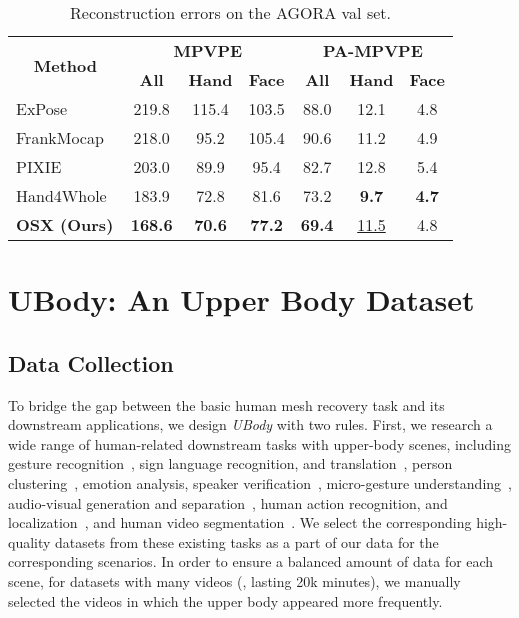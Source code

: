 \documentclass[10pt,twocolumn,letterpaper]{article}
\newcommand{\dataname}{\emph{UBody}\xspace}
\begin{document}
\begin{table}[h]
\centering
  \resizebox{\linewidth}{!}
{
    \begin{tabular}{l|ccc|ccc}
    \toprule
    \multicolumn{1}{c|}{\multirow{2}[4]{*}{\textbf{Method}}} & \multicolumn{3}{c|}{\boldmath{}\textbf{MPVPE }\unboldmath{}} & \multicolumn{3}{c}{\boldmath{}\textbf{PA-MPVPE }\unboldmath{}}\\
    \cmidrule{2-7}
    & \textbf{All} & \textbf{Hand} & \textbf{Face} & \textbf{All} & \textbf{Hand} & \textbf{Face} \\
    \midrule
ExPose~\cite{PavlakosGeorgios2020expose} &219.8 & 115.4 & 103.5 & 88.0 & 12.1 & 4.8 \\
    FrankMocap~\cite{Rong_2021frank} & 218.0 & 95.2 & 105.4 & 90.6 &11.2 &4.9  \\
    PIXIE~\cite{Feng_2021_pixie} &203.0 & 89.9 & 95.4 & 82.7 & 12.8  & 5.4  \\
    Hand4Whole~\cite{GyeongsikMoon2020hand4whole} &183.9 &	72.8	&81.6 & 73.2 & \textbf{9.7} &	\textbf{4.7} \\
    \textbf{OSX (Ours)} &	\textbf{168.6\color{Red}}&	\textbf{70.6}&	\textbf{77.2} & \textbf{69.4}&	\underline{11.5}& 4.8 \\
    \bottomrule
    \end{tabular}}
    \vspace{-0.2cm}
  \caption[]{Reconstruction errors on the AGORA val set.}
  \label{tab:agora_val}\vspace{-0.7cm}
\end{table}

\section{UBody: An Upper Body Dataset}
\label{sec:ubody_intro}



\subsection{Data Collection}
To bridge the gap between the basic human mesh recovery task and its downstream applications, we design \dataname with two rules. 
First, we research a wide range of human-related downstream tasks with upper-body scenes, including gesture recognition~\cite{yoonICRA19,guo2021human,mitra2007gesture}, sign language recognition, and translation~\cite{duarte2021how2sign,rastgoo2021sign,subburaj2022survey,Joze2019MSASLAL,camgoz2021content4all,zhou2021spatial}, person clustering~\cite{brown2021face}, emotion analysis, speaker verification~\cite{nagrani2020voxceleb}, micro-gesture understanding~\cite{liu2021imigue}, audio-visual generation and separation~\cite{pu2017audio}, human action recognition, and localization~\cite{pavlakos2022multishot,ChunhuiGu2017AVAAV,rockwell2020full,siarohin2021motion,fouhey2018lifestyle}, and human video segmentation~\cite{kuang2021flow}. We select the corresponding high-quality datasets from these existing tasks as a part of our data for the corresponding scenarios. In order to ensure a balanced amount of data for each scene, for datasets with many videos (\eg, lasting 20k minutes), we manually selected the videos in which the upper body appeared more frequently.
\end{document}
